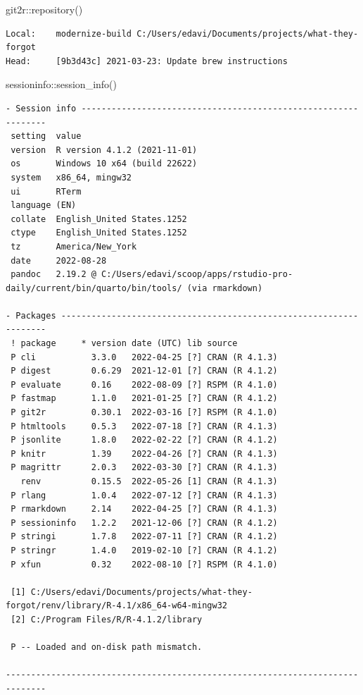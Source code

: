 \documentclass[
  letterpaper,
]{book}
\newenvironment{Shaded}{\begin{snugshade}}{\end{snugshade}}
\newcommand{\FunctionTok}[1]{\textcolor[rgb]{0.28,0.35,0.67}{#1}}
\newcommand{\NormalTok}[1]{\textcolor[rgb]{0.00,0.23,0.31}{#1}}
\newcommand{\SpecialCharTok}[1]{\textcolor[rgb]{0.37,0.37,0.37}{#1}}
\begin{document}
\begin{Shaded}
\begin{Highlighting}[]
\NormalTok{git2r}\SpecialCharTok{::}\FunctionTok{repository}\NormalTok{()}
\end{Highlighting}
\end{Shaded}

\begin{verbatim}
Local:    modernize-build C:/Users/edavi/Documents/projects/what-they-forgot
Head:     [9b3d43c] 2021-03-23: Update brew instructions
\end{verbatim}

\begin{Shaded}
\begin{Highlighting}[]
\NormalTok{sessioninfo}\SpecialCharTok{::}\FunctionTok{session\_info}\NormalTok{()}
\end{Highlighting}
\end{Shaded}

\begin{verbatim}
- Session info ---------------------------------------------------------------
 setting  value
 version  R version 4.1.2 (2021-11-01)
 os       Windows 10 x64 (build 22622)
 system   x86_64, mingw32
 ui       RTerm
 language (EN)
 collate  English_United States.1252
 ctype    English_United States.1252
 tz       America/New_York
 date     2022-08-28
 pandoc   2.19.2 @ C:/Users/edavi/scoop/apps/rstudio-pro-daily/current/bin/quarto/bin/tools/ (via rmarkdown)

- Packages -------------------------------------------------------------------
 ! package     * version date (UTC) lib source
 P cli           3.3.0   2022-04-25 [?] CRAN (R 4.1.3)
 P digest        0.6.29  2021-12-01 [?] CRAN (R 4.1.2)
 P evaluate      0.16    2022-08-09 [?] RSPM (R 4.1.0)
 P fastmap       1.1.0   2021-01-25 [?] CRAN (R 4.1.2)
 P git2r         0.30.1  2022-03-16 [?] RSPM (R 4.1.0)
 P htmltools     0.5.3   2022-07-18 [?] CRAN (R 4.1.3)
 P jsonlite      1.8.0   2022-02-22 [?] CRAN (R 4.1.2)
 P knitr         1.39    2022-04-26 [?] CRAN (R 4.1.3)
 P magrittr      2.0.3   2022-03-30 [?] CRAN (R 4.1.3)
   renv          0.15.5  2022-05-26 [1] CRAN (R 4.1.3)
 P rlang         1.0.4   2022-07-12 [?] CRAN (R 4.1.3)
 P rmarkdown     2.14    2022-04-25 [?] CRAN (R 4.1.3)
 P sessioninfo   1.2.2   2021-12-06 [?] CRAN (R 4.1.2)
 P stringi       1.7.8   2022-07-11 [?] CRAN (R 4.1.2)
 P stringr       1.4.0   2019-02-10 [?] CRAN (R 4.1.2)
 P xfun          0.32    2022-08-10 [?] RSPM (R 4.1.0)

 [1] C:/Users/edavi/Documents/projects/what-they-forgot/renv/library/R-4.1/x86_64-w64-mingw32
 [2] C:/Program Files/R/R-4.1.2/library

 P -- Loaded and on-disk path mismatch.

------------------------------------------------------------------------------
\end{verbatim}


\backmatter
\end{document}

